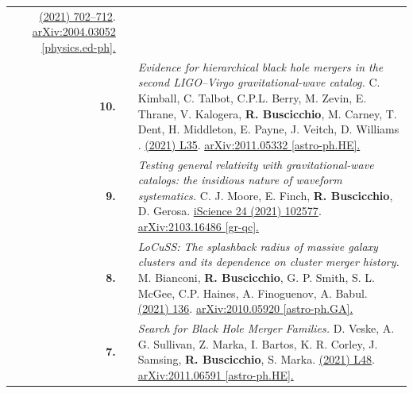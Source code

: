 {\begin{longtable}{rp{0.3cm}p{15.8cm}}
\newline{}
\href{https://pubs.aip.org/aapt/ajp/article/89/7/702/1056907/An-interactive-gravitational-wave-detector-model}{\ajp 89 (2021) 702–712}. \href{https://arxiv.org/abs/2004.03052}{arXiv:2004.03052 [physics.ed-ph].}
\vspace{0.09cm}\\
%
\textbf{10.} & & \textit{Evidence for hierarchical black hole mergers in the second LIGO--Virgo gravitational-wave catalog.}
\newline{}
C. Kimball, C. Talbot, C.P.L. Berry, M. Zevin, E. Thrane, V. Kalogera, \textbf{R. Buscicchio}, M. Carney, T. Dent, H. Middleton, E. Payne, J. Veitch, D. Williams .
\newline{}
\href{https://iopscience.iop.org/article/10.3847/2041-8213/ac0aef}{\apjl 915 (2021) L35}. \href{https://arxiv.org/abs/2011.05332}{arXiv:2011.05332 [astro-ph.HE].}
\vspace{0.09cm}\\
%
\textbf{9.} & & \textit{Testing general relativity with gravitational-wave catalogs: the insidious nature of waveform systematics.}
\newline{}
C. J. Moore, E. Finch, \textbf{R. Buscicchio}, D. Gerosa.
\newline{}
\href{https://www.sciencedirect.com/science/article/pii/S2589004221005459}{iScience 24 (2021) 102577}. \href{https://arxiv.org/abs/2103.16486}{arXiv:2103.16486 [gr-qc].}
\vspace{0.09cm}\\
%
\textbf{8.} & & \textit{LoCuSS: The splashback radius of massive galaxy clusters and its dependence on cluster merger history.}
\newline{}
M. Bianconi, \textbf{R. Buscicchio}, G. P. Smith, S. L. McGee, C.P. Haines, A. Finoguenov, A. Babul.
\newline{}
\href{https://iopscience.iop.org/article/10.3847/1538-4357/abebd7}{\apj 911 (2021) 136}. \href{https://arxiv.org/abs/2010.05920}{arXiv:2010.05920 [astro-ph.GA].}
\vspace{0.09cm}\\
%
\textbf{7.} & & \textit{Search for Black Hole Merger Families.}
\newline{}
D. Veske, A. G. Sullivan, Z. Marka, I. Bartos, K. R. Corley, J. Samsing, \textbf{R. Buscicchio}, S. Marka.
\newline{}
\href{https://iopscience.iop.org/article/10.3847/2041-8213/abd721}{\apjl 907 (2021) L48}. \href{https://arxiv.org/abs/2011.06591}{arXiv:2011.06591 [astro-ph.HE].}

\end{longtable}}
